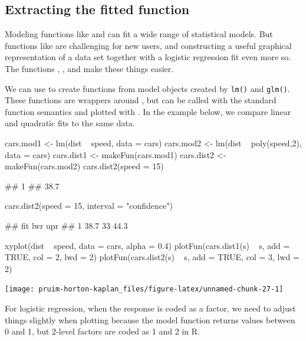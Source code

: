\subsection{Extracting the fitted
function}\label{extracting-the-fitted-function}

Modeling functions like  and  can fit a wide
range of statistical models. But functions like  are
challenging for new users, and constructing a useful graphical
representation of a data set together with a logistic regression fit
even more so. The  functions ,
, and  make these things easier.

We can use  to create functions from model objects
created by \texttt{lm()} and \texttt{glm()}. These functions are
wrappers around , but can be called with the standard
function semantics and plotted with . In the example
below, we compare linear and quadratic fits to the same data.

\begin{Schunk}
\begin{Sinput}
cars.mod1 <- lm(dist ~ speed, data = cars)
cars.mod2 <- lm(dist ~ poly(speed,2), data = cars)
cars.dist1 <- makeFun(cars.mod1)
cars.dist2 <- makeFun(cars.mod2)
cars.dist2(speed = 15)
\end{Sinput}
\begin{Soutput}
##    1 
## 38.7
\end{Soutput}
\begin{Sinput}
cars.dist2(speed = 15, interval = "confidence")
\end{Sinput}
\begin{Soutput}
##    fit lwr  upr
## 1 38.7  33 44.3
\end{Soutput}
\begin{Sinput}
xyplot(dist ~ speed, data = cars, alpha = 0.4)
plotFun(cars.dist1(s) ~ s, add = TRUE, col = 2, lwd = 2)
plotFun(cars.dist2(s) ~ s, add = TRUE, col = 3, lwd = 2)
\end{Sinput}


\begin{center}\texttt{[image: pruim-horton-kaplan\_files/figure-latex/unnamed-chunk-27-1]} \end{center}

\end{Schunk}

\noindent
For logistic regression, when the response is coded as a factor, we need
to adjust things slightly when plotting because the model function
returns values between 0 and 1, but 2-level factors are coded as 1 and 2
in R.

